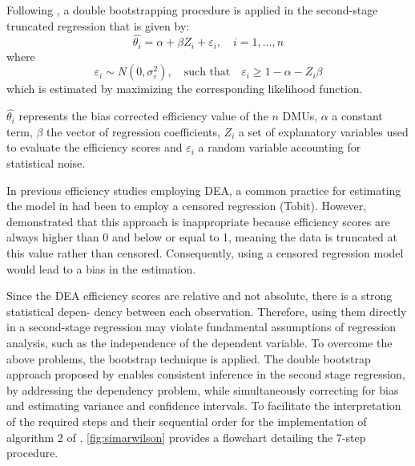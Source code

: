 Following \cite{simar2007}, a double bootstrapping procedure is applied in the second-stage
truncated regression that is given by:
\begin{equation}
\label{eq:regression}
\hat{\theta_i}=\alpha+\beta Z_i + \varepsilon_i, \quad i=1,\ldots,n   
\end{equation}
where
\begin{equation}
\label{eq:noise}
\varepsilon_i \sim N(0, \sigma_\varepsilon^2), \quad \text{such that} \quad \varepsilon_i \geq 1 - \alpha - Z_i \beta
\end{equation}
which is estimated by maximizing the corresponding likelihood function.

$\hat{\theta_i}$ represents the bias corrected efficiency value of the $n$ DMUs, $\alpha$ a constant term, $\beta$ the vector of
regression coefficients, $Z_i$ a set of explanatory variables used to evaluate the efficiency scores and $\varepsilon_i$ a
random variable accounting for statistical noise. 

In previous efficiency studies employing DEA, a common practice for estimating the model in  had been to employ a censored regression (Tobit). However, \cite{simar2007} demonstrated that this approach is inappropriate because efficiency scores are always higher than 0 and below or equal to 1, meaning the data is truncated at this value rather than censored. Consequently, using a censored regression model would lead to a bias in the estimation.

Since the DEA efficiency scores are relative and not absolute, there is a strong statistical depen-
dency between each observation. Therefore, using them directly in a second-stage regression may
violate fundamental assumptions of regression analysis, such as the independence of the dependent
variable. To overcome the above problems, the bootstrap technique is applied. The double bootstrap approach proposed
by \cite{simar2007} enables consistent inference in the second stage regression, by addressing
the dependency problem, while simultaneously correcting for bias and estimating variance and confidence intervals. 
To facilitate the interpretation of the required steps and their sequential order for the implementation
of algorithm 2 of \cite{simar2007}, \autoref{fig:simarwilson} provides a flowchart detailing the 7-step procedure.

